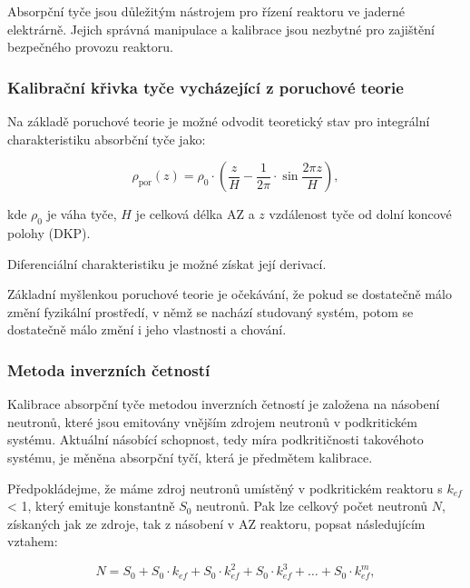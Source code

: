 Absorpční tyče jsou důležitým nástrojem pro řízení reaktoru ve jaderné elektrárně. Jejich správná manipulace a kalibrace jsou nezbytné pro zajištění bezpečného provozu reaktoru.

\subsubsection{Kalibrační křivka tyče vycházející z poruchové teorie}

Na základě poruchové teorie je možné odvodit teoretický stav pro integrální charakteristiku absorbční tyče jako:

\begin{equation*}
    \rho_\text{por} (z) = \rho_\text{0} \cdot \left(\frac{z}{H} - \frac{1}{2\pi}\cdot \sin\frac{2\pi z }{H} \right),
\end{equation*}

kde $\rho_\text{0}$ je váha tyče, $H$ je celková délka AZ a $z$ vzdálenost tyče od dolní koncové polohy (DKP).

Diferenciální charakteristiku je možné získat její derivací.

Základní myšlenkou poruchové teorie je očekávání, že pokud se dostatečně málo změní fyzikální prostředí, v němž se nachází studovaný systém, potom se dostatečně málo změní i jeho vlastnosti a chování.

\subsubsection{Metoda inverzních četností}

Kalibrace absorpční tyče metodou inverzních četností je založena na násobení neutronů, které jsou emitovány vnějším zdrojem neutronů v podkritickém systému. Aktuální násobící schopnost, tedy míra podkritičnosti takovéhoto systému, je měněna absorpční tyčí, která je předmětem kalibrace. %

Předpokládejme, že máme zdroj neutronů umístěný v podkritickém reaktoru s $k_{ef}$ < 1, který emituje konstantně $S_0$ neutronů. Pak lze celkový počet neutronů $N$, získaných jak ze zdroje, tak z násobení v AZ reaktoru, popsat následujícím vztahem:

\begin{equation*}
N = S_0 + S_0 \cdot k_{ef} + S_0 \cdot k_{ef}^2 + S_0 \cdot k_{ef}^3 + \ldots + S_0 \cdot k_{ef}^m,
\end{equation*}

